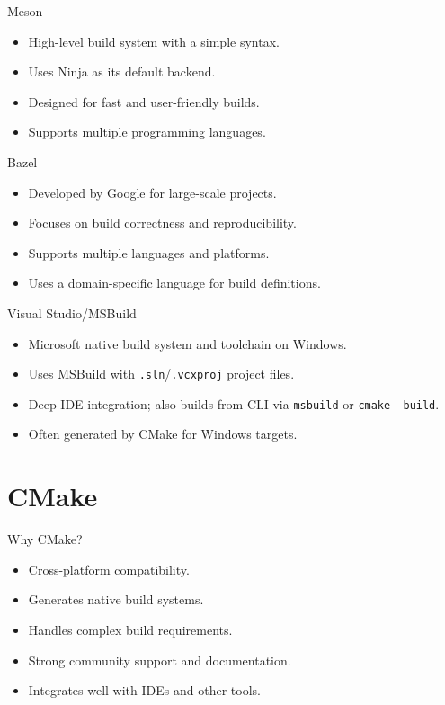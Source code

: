\documentclass{beamer}
\begin{document}
\begin{frame}{Meson}
  \begin{itemize}
    \item High-level build system with a simple syntax.
    \item Uses Ninja as its default backend.
    \item Designed for fast and user-friendly builds.
    \item Supports multiple programming languages.
  \end{itemize}
\end{frame}

\begin{frame}{Bazel}
  \begin{itemize}
    \item Developed by Google for large-scale projects.
    \item Focuses on build correctness and reproducibility.
    \item Supports multiple languages and platforms.
    \item Uses a domain-specific language for build definitions.
  \end{itemize}
\end{frame}

\begin{frame}{Visual Studio/MSBuild}
  \begin{itemize}
    \item Microsoft native build system and toolchain on Windows.
    \item Uses MSBuild with \texttt{.sln}/\texttt{.vcxproj} project files.
    \item Deep IDE integration; also builds from CLI via \texttt{msbuild} or \texttt{cmake --build}.
    \item Often generated by CMake for Windows targets.
  \end{itemize}
\end{frame}

\section{CMake}

\begin{frame}{Why CMake?}
  \begin{itemize}
    \item Cross-platform compatibility.
    \item Generates native build systems.
    \item Handles complex build requirements.
    \item Strong community support and documentation.
    \item Integrates well with IDEs and other tools.
  \end{itemize}
\end{frame}
\end{document}
